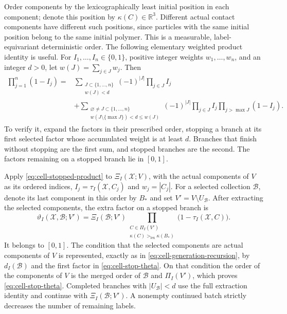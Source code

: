 Order components by the lexicographically least initial position in
each component; denote this position by $\kappa(C)\in\mathbb R^3$.
Different actual contact components have different such positions,
since particles with the same initial position belong to the same
initial polymer.  This is a measurable, label-equivariant deterministic
order.  The following elementary weighted product
identity is useful.  For $I_1,\ldots,I_n\in\{0,1\}$, positive integer
weights $w_1,\ldots,w_n$, and an integer $d>0$, let
$w(J)=\sum_{j\in J}w_j$.  Then
\begin{align}
 \prod_{j=1}^n(1-I_j)
 ={}&\sum_{\substack{J\subset\{1,\ldots,n\}\\w(J)<d}}
             (-1)^{|J|}\prod_{j\in J}I_j \nonumber\\
   &+\sum_{\substack{\varnothing\ne J\subset\{1,\ldots,n\}\\
                w(J\setminus\{\max J\})<d\leq w(J)}}
       (-1)^{|J|}\prod_{j\in J}I_j
                \prod_{j>\max J}(1-I_j).
 \label{eq:cell-stopped-product}
\end{align}
To verify it, expand the factors in their prescribed order, stopping
a branch at its first selected factor whose accumulated weight is
at least $d$.  Branches that finish without stopping are the first
sum, and stopped branches are the second.  The factors remaining
on a stopped branch lie in $[0,1]$.

Apply \eqref{eq:cell-stopped-product} to
$\Xi_I(\mathcal X;V)$, with the actual components of $V$ as its
ordered indices, $I_j=\tau_I(\mathcal X,C_j)$ and $w_j=|C_j|$.
For a selected collection $\mathcal B$, denote its last component
in this order by $B_*$ and set $V'=V\setminus U_{\mathcal B}$.
After extracting the selected components, the extra factor on
a stopped branch is
\begin{equation}
 \vartheta_I(\mathcal X,\mathcal B;V')
   =\Xi_I(\mathcal B;V')
      \prod_{\substack{C\in\Pi_I(V')\\
                   \kappa(C)>_{\mathrm{lex}}\kappa(B_*)}}
                  \bigl(1-\tau_I(\mathcal X,C)\bigr).
 \label{eq:cell-stop-theta}
\end{equation}
It belongs to $[0,1]$.  The condition that the selected components
are actual components of $V$ is represented, exactly as in
\eqref{eq:cell-generation-recursion}, by $d_I(\mathcal B)$ and the
first factor in \eqref{eq:cell-stop-theta}.  On that condition the
order of the components of $V$ is the merged order of
$\mathcal B$ and $\Pi_I(V')$, which proves
\eqref{eq:cell-stop-theta}.  Completed branches with
$|U_{\mathcal B}|<d$ use the full extraction identity and continue
with $\Xi_I(\mathcal B;V')$.  A nonempty continued batch strictly
decreases the number of remaining labels.

